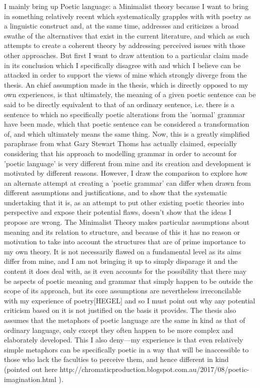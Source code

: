 \documentclass[]{article}
\begin{document}
I mainly bring up Poetic language: a Minimalist theory because I want to bring in something relatively recent which systematically grapples with with poetry as a linguistic construct and, at the same time, addresses and criticizes a broad swathe of the alternatives that exist in the current literature, and which as such attempts to create a coherent theory by addressing perceived issues with those other approaches. But first I want to draw attention to a particular claim made in its conclusion which I specifically disagree with and which I believe can be attacked in order to support the views of mine which strongly diverge from the thesis. An chief assumption made in the thesis, which is directly opposed to my own experiences, is that ultimately, the meaning of a given poetic sentence can be said to be directly equivalent to that of an ordinary sentence, i.e. there is a sentence to which no specifically poetic alterations from the 'normal' grammar have been made, which that poetic sentence can be considered a transformation of, and which ultimately means the same thing. Now, this is a greatly simplified paraphrase from what Gary Stewart Thoms has actually claimed, especially considering that his approach to modelling grammar in order to account for 'poetic language' is very different from mine and its creation and development is motivated by different reasons. However, I draw the comparison to explore how an alternate attempt at creating a 'poetic grammar' can differ when drawn from different assumptions and justifications, and to show that the systematic undertaking that it is, as an attempt to put other existing poetic theories into perspective and expose their potential flaws, doesn't show that the ideas I propose are wrong. The Minimalist Theory makes particular assumptions about meaning and its relation to structure, and because of this it has no reason or motivation to take into account the structures that are of prime importance to my own theory. It is not necessarily flawed on a fundamental level as its aims differ from mine, and I am not bringing it up to simply disparage it and the content it does deal with, as it even accounts for the possibility that there may be aspects of poetic meaning and grammar that simply happen to be outside the scope of its approach, but its core assumptions are nevertheless irreconcilable with my experience of poetry[HEGEL] and so I must point out why any potential criticism based on it is not justified on the basis it provides. The thesis also assumes that the metaphors of poetic language are the same in kind as that of ordinary language, only except they often happen to be more complex and elaborately developed. This I also deny—my experience is that even relatively simple metaphors can be specifically poetic in a way that will be inaccessible to those who lack the faculties to perceive them, and hence different in kind (pointed out here http://chromaticproduction.blogspot.com.au/2017/08/poetic-imagination.html ).
\end{document}
